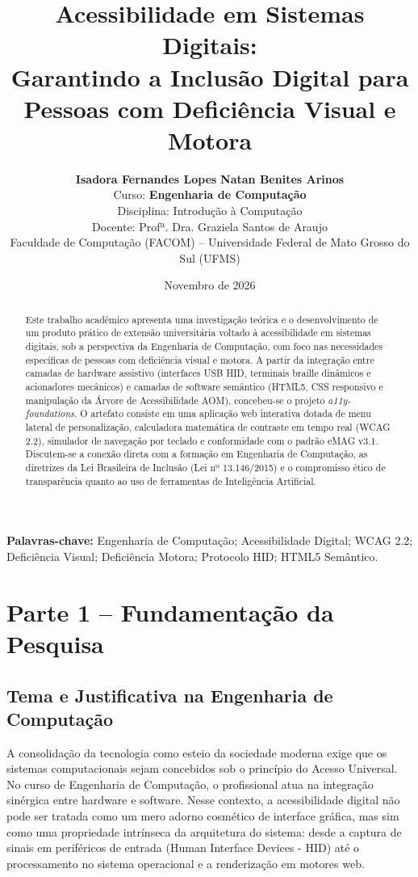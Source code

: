 \documentclass[12pt,a4paper]{article}
\title{\textbf{Acessibilidade em Sistemas Digitais:}\\Garantindo a Inclusão Digital para Pessoas com Deficiência Visual e Motora}
\author{
  \textbf{Isadora Fernandes Lopes} \quad \textbf{Natan Benites Arinos} \\[0.2cm]
  \small Curso: \textbf{Engenharia de Computação} \\[0.1cm]
  \small Disciplina: Introdução à Computação \\[0.1cm]
  \small Docente: Profª. Dra. Graziela Santos de Araujo \\[0.1cm]
  \small Faculdade de Computação (FACOM) -- Universidade Federal de Mato Grosso do Sul (UFMS)
}
\date{Novembro de 2026}
\begin{document}
\maketitle

\begin{abstract}
Este trabalho acadêmico apresenta uma investigação teórica e o desenvolvimento de um produto prático de extensão universitária voltado à acessibilidade em sistemas digitais, sob a perspectiva da Engenharia de Computação, com foco nas necessidades específicas de pessoas com deficiência visual e motora. A partir da integração entre camadas de hardware assistivo (interfaces USB HID, terminais braille dinâmicos e acionadores mecânicos) e camadas de software semântico (HTML5, CSS responsivo e manipulação da Árvore de Acessibilidade AOM), concebeu-se o projeto \textit{a11y-foundations}. O artefato consiste em uma aplicação web interativa dotada de menu lateral de personalização, calculadora matemática de contraste em tempo real (WCAG 2.2), simulador de navegação por teclado e conformidade com o padrão eMAG v3.1. Discutem-se a conexão direta com a formação em Engenharia de Computação, as diretrizes da Lei Brasileira de Inclusão (Lei nº 13.146/2015) e o compromisso ético de transparência quanto ao uso de ferramentas de Inteligência Artificial.
\end{abstract}

\vspace{0.3cm}
\noindent\textbf{Palavras-chave:} Engenharia de Computação; Acessibilidade Digital; WCAG 2.2; Deficiência Visual; Deficiência Motora; Protocolo HID; HTML5 Semântico.

\section{Parte 1 -- Fundamentação da Pesquisa}

\subsection{Tema e Justificativa na Engenharia de Computação}
A consolidação da tecnologia como esteio da sociedade moderna exige que os sistemas computacionais sejam concebidos sob o princípio do Acesso Universal. No curso de Engenharia de Computação, o profissional atua na integração sinérgica entre hardware e software. Nesse contexto, a acessibilidade digital não pode ser tratada como um mero adorno cosmético de interface gráfica, mas sim como uma propriedade intrínseca da arquitetura do sistema: desde a captura de sinais em periféricos de entrada (Human Interface Devices - HID) até o processamento no sistema operacional e a renderização em motores web.
\end{document}
